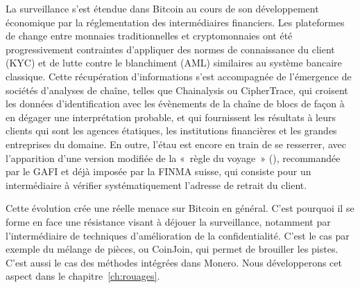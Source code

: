 La surveillance s'est étendue dans Bitcoin au cours de son développement économique par la réglementation des intermédiaires financiers. Les plateformes de change entre monnaies traditionnelles et cryptomonnaies ont été progressivement contraintes d'appliquer des normes de connaissance du client (KYC) et de lutte contre le blanchiment (AML) similaires au système bancaire classique. Cette récupération d'informations s'est accompagnée de l'émergence de sociétés d'analyses de chaîne, telles que Chainalysis ou CipherTrace, qui croisent les données d'identification avec les évènements de la chaîne de blocs de façon à en dégager une interprétation probable, et qui fournissent les résultats à leurs clients qui sont les agences étatiques, les institutions financières et les grandes entreprises du domaine. En outre, l'étau est encore en train de se resserrer, avec l'apparition d'une version modifiée de la «~règle du voyage~» (), recommandée par le GAFI et déjà imposée par la FINMA suisse, qui consiste pour un intermédiaire à vérifier systématiquement l'adresse de retrait du client.

Cette évolution crée une réelle menace sur Bitcoin en général. C'est pourquoi il se forme en face une résistance visant à déjouer la surveillance, notamment par l'intermédiaire de techniques d'amélioration de la confidentialité. C'est le cas par exemple du mélange de pièces, ou CoinJoin, qui permet de brouiller les pistes. C'est aussi le cas des méthodes intégrées dans Monero. Nous développerons cet aspect dans le chapitre~\ref{ch:rouages}. %

